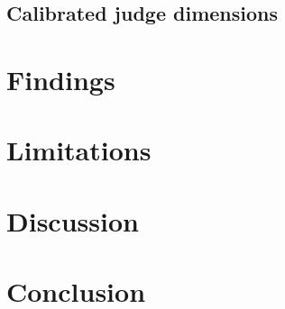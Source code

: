 \documentclass{article}
\begin{document}

\subsection{Calibrated judge dimensions}


\section{Findings}
\label{sec:findings}


\section{Limitations}
\label{sec:limitations}


\section{Discussion}
\label{sec:discussion}


\section{Conclusion}
\label{sec:conclusion}




\end{document}
